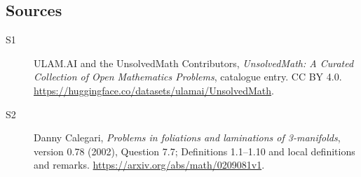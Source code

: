 \documentclass[11pt]{article}
\begin{document}
\subsection{Sources}
\begin{description}
\item[\hypertarget{source:statement:1}{S1}] ULAM.AI and the UnsolvedMath Contributors, \emph{UnsolvedMath: A Curated Collection of Open Mathematics Problems}, catalogue entry. CC BY 4.0. \url{https://huggingface.co/datasets/ulamai/UnsolvedMath}.
\item[\hypertarget{source:statement:2}{S2}] Danny Calegari, \emph{Problems in foliations and laminations of 3-manifolds}, version 0.78 (2002), Question 7.7; Definitions 1.1--1.10 and local definitions and remarks. \url{https://arxiv.org/abs/math/0209081v1}.
\end{description}
\label{end:statement}
\end{document}
